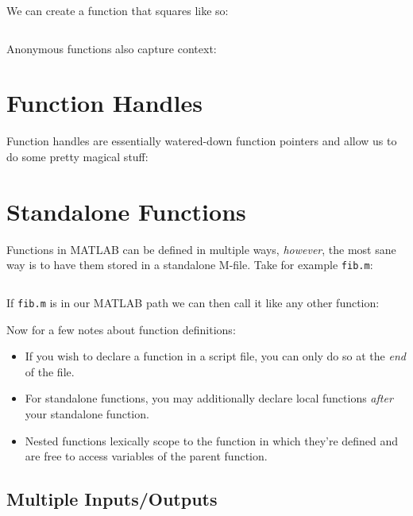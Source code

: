 \documentclass{article}
\begin{document}
We can create a function that squares like so:

\inputminted{matlab}{04-functions.d/sq.m}

Anonymous functions also capture context:


\section{Function Handles}

Function handles are essentially watered-down function pointers and
allow us to do some pretty magical stuff:


\section{Standalone Functions}

Functions in MATLAB can be defined in multiple ways, \emph{however}, the
most sane way is to have them stored in a standalone M-file.  Take for
example \texttt{fib.m}:

\inputminted{matlab}{04-functions.d/fib.m}

If \texttt{fib.m} is in our MATLAB path we can then call it like any
other function:


\newpage

Now for a few notes about function definitions:

\begin{itemize}
	\item
		If you wish to declare a function in a script file, you
		can only do so at the \emph{end} of the file.

	\item
		For standalone functions, you may additionally declare
		local functions \emph{after} your standalone function.

	\item
		Nested functions lexically scope to the function in
		which they're defined and are free to access variables
		of the parent function.
\end{itemize}

\subsection{Multiple Inputs/Outputs}
\end{document}
